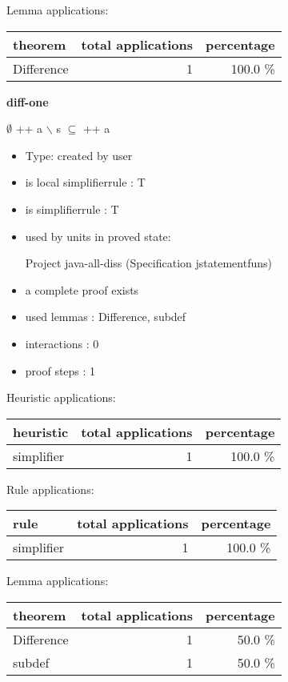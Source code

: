 \documentclass[a4paper]{article}
\begin{document}
Lemma applications:

\begin{supertabular}{l|r|r}
theorem	        & total applications & percentage \\ \hline
Difference & 1 & 100.0 \% \\

\end{supertabular}
\pagebreak

{\LARGE\bf diff-one}\label{lemma-diff-one}

\medskip

 \Fol $\emptyset$ ++ a $\backslash$ s $\subseteq$  ++ a

\begin{itemize}

\item Type: created by user

\item is local simplifierrule : T
\item is simplifierrule : T
\item used by units in proved state:

Project java-all-diss (Specification jstatementfuns)
\item       a complete proof exists
\item       used lemmas  : Difference, subdef
\item       interactions : 0
\item       proof steps  : 1
\end{itemize}

\medskip


Heuristic applications:

\begin{supertabular}{l|r|r}
heuristic	& total applications & percentage \\ \hline
simplifier & 1 & 100.0 \% \\

\end{supertabular}

Rule applications:

\begin{supertabular}{l|r|r}
rule	        & total applications & percentage \\ \hline
simplifier & 1 & 100.0 \% \\

\end{supertabular}

Lemma applications:

\begin{supertabular}{l|r|r}
theorem	        & total applications & percentage \\ \hline
Difference & 1 & 50.0 \% \\
subdef & 1 & 50.0 \% \\

\end{supertabular}
\pagebreak
\end{document}
